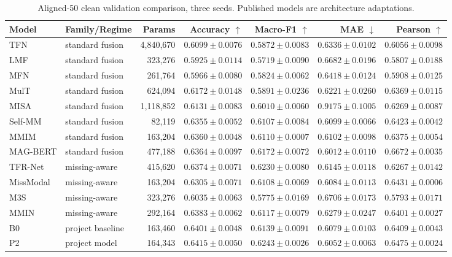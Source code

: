 \begin{table}[t]
\centering
\small
\begin{tabular}{llrrrrr}
\toprule
Model & Family/Regime & Params & Accuracy $\uparrow$ & Macro-F1 $\uparrow$ & MAE $\downarrow$ & Pearson $\uparrow$ \\
\midrule
TFN & standard fusion & 4,840,670 & $0.6099\pm0.0076$ & $0.5872\pm0.0083$ & $0.6336\pm0.0102$ & $0.6056\pm0.0098$ \\
LMF & standard fusion & 323,276 & $0.5925\pm0.0114$ & $0.5719\pm0.0090$ & $0.6682\pm0.0196$ & $0.5807\pm0.0188$ \\
MFN & standard fusion & 261,764 & $0.5966\pm0.0080$ & $0.5824\pm0.0062$ & $0.6418\pm0.0124$ & $0.5908\pm0.0125$ \\
MulT & standard fusion & 624,094 & $0.6172\pm0.0148$ & $0.5891\pm0.0236$ & $0.6221\pm0.0260$ & $0.6369\pm0.0115$ \\
MISA & standard fusion & 1,118,852 & $0.6131\pm0.0083$ & $0.6010\pm0.0060$ & $0.9175\pm0.1005$ & $0.6269\pm0.0087$ \\
Self-MM & standard fusion & 82,119 & $0.6355\pm0.0052$ & $0.6107\pm0.0084$ & $0.6099\pm0.0066$ & $0.6423\pm0.0042$ \\
MMIM & standard fusion & 163,204 & $0.6360\pm0.0048$ & $0.6110\pm0.0007$ & $0.6102\pm0.0098$ & $0.6375\pm0.0054$ \\
MAG-BERT & standard fusion & 477,188 & $0.6364\pm0.0097$ & $0.6172\pm0.0072$ & $0.6012\pm0.0110$ & $0.6672\pm0.0035$ \\
TFR-Net & missing-aware & 415,620 & $0.6374\pm0.0071$ & $0.6230\pm0.0080$ & $0.6145\pm0.0118$ & $0.6267\pm0.0142$ \\
MissModal & missing-aware & 163,204 & $0.6305\pm0.0071$ & $0.6108\pm0.0069$ & $0.6084\pm0.0113$ & $0.6431\pm0.0006$ \\
M3S & missing-aware & 323,276 & $0.6035\pm0.0063$ & $0.5775\pm0.0169$ & $0.6706\pm0.0173$ & $0.5793\pm0.0171$ \\
MMIN & missing-aware & 292,164 & $0.6383\pm0.0062$ & $0.6117\pm0.0079$ & $0.6279\pm0.0247$ & $0.6401\pm0.0027$ \\
B0 & project baseline & 163,460 & $0.6401\pm0.0048$ & $0.6139\pm0.0091$ & $0.6079\pm0.0103$ & $0.6409\pm0.0043$ \\
P2 & project model & 164,343 & $0.6415\pm0.0050$ & $0.6243\pm0.0026$ & $0.6052\pm0.0063$ & $0.6475\pm0.0024$ \\
\bottomrule
\end{tabular}
\caption{Aligned-50 clean validation comparison, three seeds. Published models are architecture adaptations.}
\label{tab:q2_expanded_clean}
\end{table}

